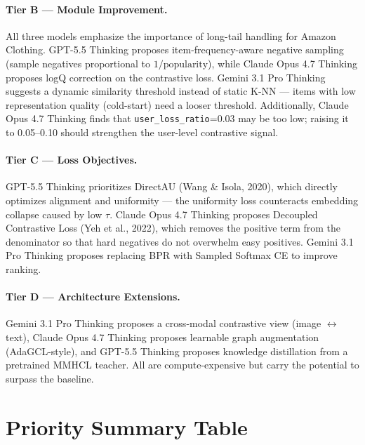 \documentclass[11pt,a4paper]{article}
\begin{document}
\paragraph{Tier B --- Module Improvement.}
All three models emphasize the importance of long-tail handling for Amazon Clothing. GPT-5.5 Thinking proposes item-frequency-aware negative sampling (sample negatives proportional to $1/\text{popularity}$), while Claude Opus 4.7 Thinking proposes logQ correction on the contrastive loss. Gemini 3.1 Pro Thinking suggests a dynamic similarity threshold instead of static K-NN --- items with low representation quality (cold-start) need a looser threshold. Additionally, Claude Opus 4.7 Thinking finds that \texttt{user\_loss\_ratio}=0.03 may be too low; raising it to 0.05--0.10 should strengthen the user-level contrastive signal.

\paragraph{Tier C --- Loss Objectives.}
GPT-5.5 Thinking prioritizes DirectAU (Wang \& Isola, 2020), which directly optimizes alignment and uniformity --- the uniformity loss counteracts embedding collapse caused by low $\tau$. Claude Opus 4.7 Thinking proposes Decoupled Contrastive Loss (Yeh et al., 2022), which removes the positive term from the denominator so that hard negatives do not overwhelm easy positives. Gemini 3.1 Pro Thinking proposes replacing BPR with Sampled Softmax CE to improve ranking.

\paragraph{Tier D --- Architecture Extensions.}
Gemini 3.1 Pro Thinking proposes a cross-modal contrastive view (image $\leftrightarrow$ text), Claude Opus 4.7 Thinking proposes learnable graph augmentation (AdaGCL-style), and GPT-5.5 Thinking proposes knowledge distillation from a pretrained MMHCL teacher. All are compute-expensive but carry the potential to surpass the baseline.

\section{Priority Summary Table}
\end{document}
